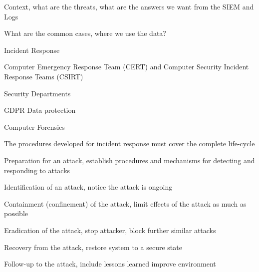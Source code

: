 \documentclass[Screen16to9,17pt]{foils}
\begin{document}


\begin{list1}
\item Context, what are the threats, what are the answers we want from the SIEM and Logs

\item What are the common cases, where we use the data?

\begin{list2}
\item Incident Response
\item Computer Emergency Response Team (CERT) and Computer Security Incident Response Teams (CSIRT)
\item Security Departments
\item GDPR Data protection
\item Computer Forensics
\end{list2}

\end{list1}



The procedures developed for incident response must cover the complete life-cycle

\begin{list2}
\item  Preparation for an attack, establish procedures and mechanisms for detecting and responding to attacks
\item  Identification of an attack, notice the attack is ongoing
\item  Containment (confinement) of the attack, limit effects of the attack as much as possible
\item  Eradication of the attack, stop attacker, block further similar attacks
\item  Recovery from the attack, restore system to a secure state
\item  Follow-up to the attack, include lessons learned  improve environment
\end{list2}


\end{document}
